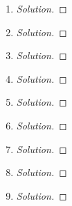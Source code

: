 \begin{enumerate}
	\item
	\begin{proof}[Solution]
	\end{proof}
	\item
	\begin{proof}[Solution]
	\end{proof}
	\item
	\begin{proof}[Solution]
	\end{proof}
	\item
	\begin{proof}[Solution]
	\end{proof}
	\item
	\begin{proof}[Solution]
	\end{proof}
	\item
	\begin{proof}[Solution]
	\end{proof}
	\item
	\begin{proof}[Solution]
	\end{proof}
	\item
	\begin{proof}[Solution]
	\end{proof}
	\item
	\begin{proof}[Solution]
	\end{proof}
\end{enumerate}

